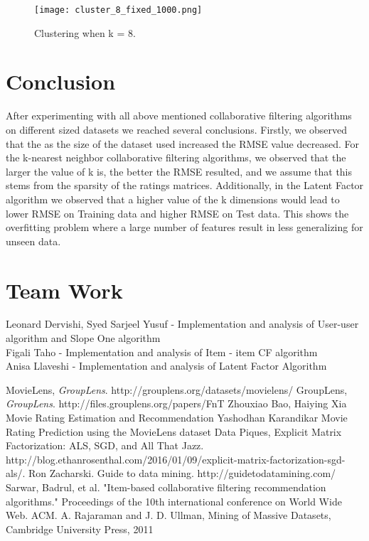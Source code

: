 \documentclass[a4paper]{article}
\begin{document}
\begin{figure}
\centering
\texttt{[image: cluster\_8\_fixed\_1000.png]}
\caption{\label{fig:clustering}Clustering when k = 8.}
\end{figure}

\section{Conclusion}
After experimenting with all above mentioned collaborative filtering algorithms on different sized datasets we reached several conclusions. Firstly, we observed that the as the size of the dataset used increased the RMSE value decreased. For the k-nearest neighbor collaborative filtering algorithms, we observed that the larger the value of k is, the better the RMSE resulted, and we assume that this stems from the sparsity of the ratings matrices. Additionally, in the Latent Factor algorithm we observed that a higher value of the k dimensions would lead to lower RMSE on Training data and higher RMSE on Test data. This shows the overfitting problem where a large number of features result in less generalizing for unseen data.

\section*{Team Work}
Leonard Dervishi, Syed Sarjeel Yusuf - Implementation and analysis of User-user algorithm and Slope One algorithm  \\ 
Figali Taho - Implementation and analysis of Item - item CF algorithm \\
Anisa Llaveshi - Implementation and analysis of Latent Factor Algorithm 

\newpage

\begin{thebibliography}{9}
  MovieLens,
  \emph{GroupLens}.
  http://grouplens.org/datasets/movielens/
  GroupLens,
  \emph{GroupLens}.
	http://files.grouplens.org/papers/FnT%
  Zhouxiao Bao, Haiying Xia
  Movie Rating Estimation and Recommendation
  Yashodhan Karandikar
Movie Rating Prediction using the MovieLens dataset
Data Piques, Explicit Matrix Factorization: ALS, SGD, and All That Jazz.
http://blog.ethanrosenthal.com/2016/01/09/explicit-matrix-factorization-sgd-als/.
Ron Zacharski. Guide to data mining.
http://guidetodatamining.com/
Sarwar, Badrul, et al. "Item-based collaborative filtering recommendation algorithms." Proceedings of the 10th international conference on World Wide Web. ACM.
A. Rajaraman and J. D. Ullman, Mining of Massive Datasets, Cambridge University Press, 2011
\end{thebibliography}
\end{document}
